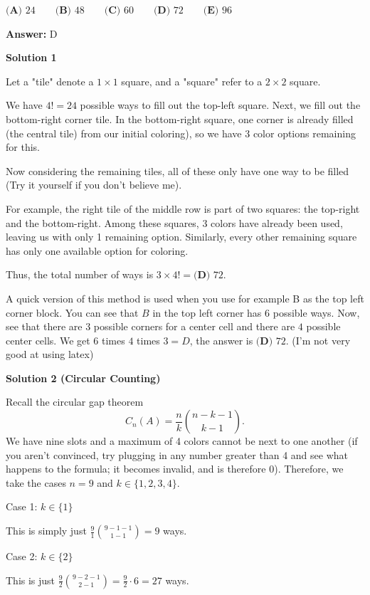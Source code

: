 \begin{enumerate}
$\textbf{(A) }24\qquad\textbf{(B) }48\qquad\textbf{(C) }60\qquad\textbf{(D) }72\qquad\textbf{(E) }96$

 \textbf{Answer: }D



\textbf{Solution 1}

Let a "tile" denote a \(1 \times 1\) square, and a "square" refer to a \(2 \times 2\) square.

 We have \(4! = 24\) possible ways to fill out the top-left square. Next, we fill out the bottom-right corner tile. In the bottom-right square, one corner is already filled (the central tile) from our initial coloring), so we have 3 color options remaining for this. 

 Now considering the remaining tiles, all of these only have one way to be filled (Try it yourself if you don’t believe me).

 For example, the right tile of the middle row is part of two squares: the top-right and the bottom-right. Among these squares, 3 colors have already been used, leaving us with only 1 remaining option. Similarly, every other remaining square has only one available option for coloring. 

 Thus, the total number of ways is \(3 \times 4! = \boxed{\textbf{(D) }72}\).

 A quick version of this method is used when you use for example B as the top left corner block. You can see that $B$ in the top left corner has $6$ possible ways. Now, see that there are $3$ possible corners for a center cell and there are $4$ possible center cells. We get $6$ times $4$ times $3 = D$, the answer is \( \boxed{\textbf{(D) }72}\). (I'm not very good at using latex)

 



\textbf{Solution 2 (Circular Counting)}

Recall the circular gap theorem
 \[C_n(A) = \frac{n}{k} \binom{n-k-1}{k-1}.\]We have nine slots and a maximum of 4 colors cannot be next to one another (if you aren't convinced, try plugging in any number greater than 4 and see what happens to the formula; it becomes invalid, and is therefore 0). Therefore, we take the cases $n=9$ and $k \in \{1,2,3,4\}$.

 Case 1: $k \in \{1\}$

 This is simply just $\frac{9}{1} \binom{9-1-1}{1-1} = 9$ ways.

 Case 2: $k \in \{2\}$

 This is just $\frac{9}{2} \binom{9-2-1}{2-1} = \frac{9}{2} \cdot 6 = 27$ ways.


\end{enumerate}
